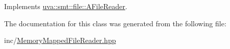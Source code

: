 Implements \hyperlink{classuva_1_1smt_1_1file_1_1_a_file_reader_a689d18c81e821000322f5e3c3acff838}{uva\+::smt\+::file\+::\+A\+File\+Reader}.



The documentation for this class was generated from the following file\+:\begin{DoxyCompactItemize}
\item 
inc/\hyperlink{_memory_mapped_file_reader_8hpp}{Memory\+Mapped\+File\+Reader.\+hpp}\end{DoxyCompactItemize}
